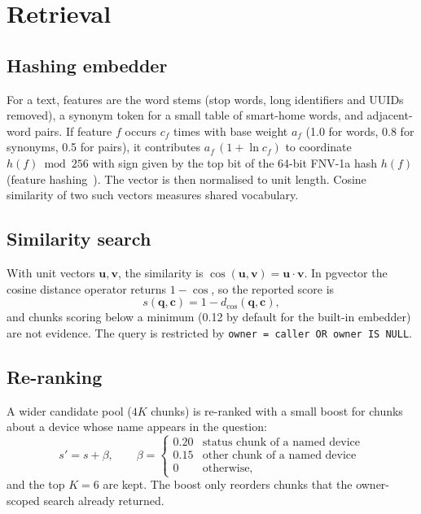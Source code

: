 \documentclass[12pt,a4paper,oneside]{report}
\begin{document}
\section{Retrieval}
\subsection{Hashing embedder}
For a text, features are the word stems (stop words, long identifiers and UUIDs removed), a synonym token for a small table of smart-home words, and adjacent-word pairs. If feature $f$ occurs $c_f$ times with base weight $a_f$ (1.0 for words, 0.8 for synonyms, 0.5 for pairs), it contributes $a_f\,(1+\ln c_f)$ to coordinate $h(f)\bmod 256$ with sign given by the top bit of the 64-bit FNV-1a hash $h(f)$ (feature hashing~\cite{weinberger2009hash}). The vector is then normalised to unit length. Cosine similarity of two such vectors measures shared vocabulary.

\subsection{Similarity search}
With unit vectors $\mathbf{u},\mathbf{v}$, the similarity is $\cos(\mathbf{u},\mathbf{v})=\mathbf{u}\cdot\mathbf{v}$. In pgvector the cosine distance operator returns $1-\cos$, so the reported score is
\begin{equation}
  s(\mathbf{q},\mathbf{c})=1-d_{\cos}(\mathbf{q},\mathbf{c}),
\end{equation}
and chunks scoring below a minimum (0.12 by default for the built-in embedder) are not evidence. The query is restricted by \texttt{owner = caller OR owner IS NULL}.

\subsection{Re-ranking}
A wider candidate pool ($4K$ chunks) is re-ranked with a small boost for chunks about a device whose name appears in the question:
\begin{equation}
  s'=s+\beta,\qquad \beta=\begin{cases}0.20&\text{status chunk of a named device}\\0.15&\text{other chunk of a named device}\\0&\text{otherwise,}\end{cases}
\end{equation}
and the top $K=6$ are kept. The boost only reorders chunks that the owner-scoped search already returned.
\end{document}
